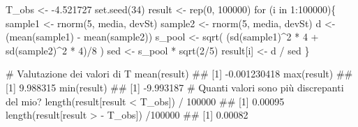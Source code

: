\documentclass[a4paper,12pt,oneside]{book}
\newenvironment{Shaded}{\begin{snugshade}}{\end{snugshade}}
\newcommand{\DecValTok}[1]{#1}
\newcommand{\FloatTok}[1]{#1}
\newcommand{\SpecialCharTok}[1]{#1}
\newcommand{\CommentTok}[1]{#1}
\newcommand{\DocumentationTok}[1]{#1}
\newcommand{\OtherTok}[1]{#1}
\newcommand{\FunctionTok}[1]{#1}
\newcommand{\ControlFlowTok}[1]{#1}
\newcommand{\NormalTok}[1]{#1}
\begin{document}
\begin{Shaded}
\begin{Highlighting}[]
\NormalTok{T\_obs }\OtherTok{\textless{}{-}} \SpecialCharTok{{-}}\FloatTok{4.521727}
\FunctionTok{set.seed}\NormalTok{(}\DecValTok{34}\NormalTok{)}
\NormalTok{result }\OtherTok{\textless{}{-}} \FunctionTok{rep}\NormalTok{(}\DecValTok{0}\NormalTok{, }\DecValTok{100000}\NormalTok{)}
\ControlFlowTok{for}\NormalTok{ (i }\ControlFlowTok{in} \DecValTok{1}\SpecialCharTok{:}\DecValTok{100000}\NormalTok{)\{}
\NormalTok{  sample1 }\OtherTok{\textless{}{-}} \FunctionTok{rnorm}\NormalTok{(}\DecValTok{5}\NormalTok{, media, devSt)}
\NormalTok{  sample2 }\OtherTok{\textless{}{-}} \FunctionTok{rnorm}\NormalTok{(}\DecValTok{5}\NormalTok{, media, devSt)}
\NormalTok{  d }\OtherTok{\textless{}{-}}\NormalTok{ (}\FunctionTok{mean}\NormalTok{(sample1) }\SpecialCharTok{{-}} \FunctionTok{mean}\NormalTok{(sample2))}
\NormalTok{  s\_pool }\OtherTok{\textless{}{-}} \FunctionTok{sqrt}\NormalTok{( (}\FunctionTok{sd}\NormalTok{(sample1)}\SpecialCharTok{\^{}}\DecValTok{2} \SpecialCharTok{*} \DecValTok{4} \SpecialCharTok{+} \FunctionTok{sd}\NormalTok{(sample2)}\SpecialCharTok{\^{}}\DecValTok{2} \SpecialCharTok{*} \DecValTok{4}\NormalTok{)}\SpecialCharTok{/}\DecValTok{8}\NormalTok{ )}
\NormalTok{  sed }\OtherTok{\textless{}{-}}\NormalTok{ s\_pool }\SpecialCharTok{*} \FunctionTok{sqrt}\NormalTok{(}\DecValTok{2}\SpecialCharTok{/}\DecValTok{5}\NormalTok{)}
\NormalTok{  result[i] }\OtherTok{\textless{}{-}}\NormalTok{  d }\SpecialCharTok{/}\NormalTok{ sed}
\NormalTok{\}}

\CommentTok{\# Valutazione dei valori di T}
\FunctionTok{mean}\NormalTok{(result)}
\DocumentationTok{\#\# [1] {-}0.001230418}
\FunctionTok{max}\NormalTok{(result)}
\DocumentationTok{\#\# [1] 9.988315}
\FunctionTok{min}\NormalTok{(result)}
\DocumentationTok{\#\# [1] {-}9.993187}
\CommentTok{\# Quanti valori sono più discrepanti del mio?}
\FunctionTok{length}\NormalTok{(result[result }\SpecialCharTok{\textless{}}\NormalTok{ T\_obs]) }\SpecialCharTok{/} \DecValTok{100000}
\DocumentationTok{\#\# [1] 0.00095}
\FunctionTok{length}\NormalTok{(result[result }\SpecialCharTok{\textgreater{}} \SpecialCharTok{{-}}\NormalTok{ T\_obs]) }\SpecialCharTok{/}\DecValTok{100000}
\DocumentationTok{\#\# [1] 0.00082}
\end{Highlighting}
\end{Shaded}
\end{document}
